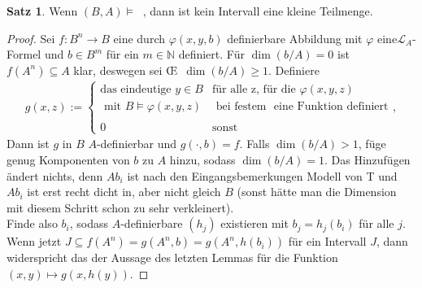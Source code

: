 \documentclass[a4paper, 11pt]{report}
\newcommand{\lingua}{\mathcal{L}}
\newcommand{\setN}{\mathbb{N}}
\DeclareMathOperator{\td}{T^d}
\theoremstyle{definition}
\newtheorem{theorem}[subsection]{Satz}
\begin{document}
\begin{theorem}
	Wenn $(B,A)\models\td$, dann ist kein Intervall eine kleine Teilmenge.
\end{theorem}
\begin{proof}
	Sei $f:B^n\rightarrow B$ eine durch $\varphi(x,y,b)$ definierbare Abbildung mit $\varphi$ eine\linebreak$\lingua_A$-Formel und $b\in B^m$ für ein $m\in\setN$ definiert. Für $\dim(b/A)=0$ ist $f(A^n)\subseteq A$ klar, deswegen sei \OE\ $\dim(b/A)\geq1$. Definiere
	\begin{align*}
	g(x,z):=\left\{\begin{array}{ll}
	\text{das eindeutige }y\in B &\text{für alle z, für die }\varphi(x,y,z)\\
	\text{ mit }B\models\varphi(x,y,z) &\text{ bei festem }\text{ eine Funktion definiert}\\
	\ &\ \\
	0 &\text{sonst}
	\end{array}\right.,
	\end{align*}
	Dann ist $g$ in $B$ $A$-definierbar und $g(\cdot,b)=f$. Falls $\dim(b/A)>1$, füge genug Komponenten von $b$ zu $A$ hinzu, sodass $\dim(b/A)=1$. Das Hinzufügen ändert nichts, denn $Ab_i$ ist nach den Eingangsbemerkungen Modell von T und $Ab_i$ ist erst recht dicht in, aber nicht gleich $B$ (sonst hätte man die Dimension mit diesem Schritt schon zu sehr verkleinert).\\
	Finde also $b_i$, sodass $A$-definierbare $(h_j)$ existieren mit $b_j=h_j(b_i)$ für alle $j$. Wenn jetzt $J\subseteq f(A^n)=g(A^n,b)=g(A^n,h(b_i))$ für ein Intervall $J$, dann widerspricht das der Aussage des letzten Lemmas für die Funktion $(x,y)\mapsto g(x,h(y))$.
\end{proof}
\end{document}
